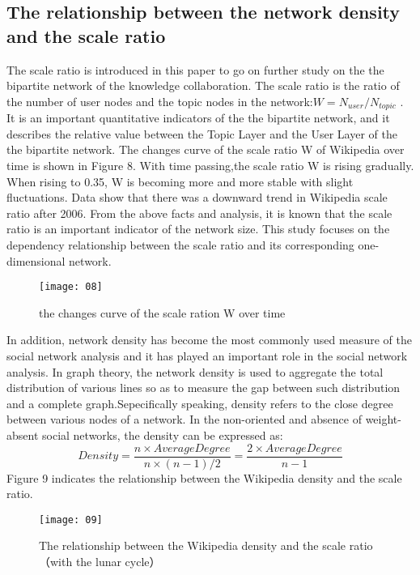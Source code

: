 \documentclass{elsarticle}
\begin{document}
\subsection{The relationship between the network density and the scale ratio}
\label{sec:relat-betw-netw}
The scale ratio is introduced in this paper to go on further study on
the the bipartite network of the knowledge collaboration. The scale
ratio is the ratio of the number of user nodes and the topic nodes in
the network:$W=N_{user}/N_{topic}$ . It is an important quantitative
indicators of the the bipartite network, and it describes the relative
value between the Topic Layer and the User Layer of the the bipartite
network. The changes curve of the scale ratio W of Wikipedia over time
is shown in Figure 8. With time passing,the scale ratio W is rising
gradually. When rising to 0.35, W is becoming more and more stable
with slight fluctuations. Data show that there was a downward trend in
Wikipedia scale ratio after 2006. From the above facts and analysis,
it is known that the scale ratio is an important indicator of the
network size. This study focuses on the dependency relationship
between the scale ratio and its corresponding one-dimensional network.
\begin{figure}[htpb]
  \centering
  \texttt{[image: 08]}
  \caption{the changes curve of the scale ration W over time}
\end{figure}
In addition, network density has become the most commonly used measure of the social network analysis and it has played an important role in the social network analysis. In graph theory, the network density is used to aggregate the total distribution of various lines so as to measure the gap between such distribution and a complete graph.Sepecifically speaking, density refers to the close degree between various nodes of a network. In the non-oriented and absence of weight-absent social networks, the density can be expressed as:
\begin{equation}
  \label{eq:3}
  Density=\frac{n\times AverageDegree}{n\times(n-1)/2}=\frac{2\times AverageDegree}{n-1}
\end{equation}
Figure 9 indicates the relationship between the Wikipedia density and the scale ratio. 
\begin{figure}[htpb]
  \centering
  \texttt{[image: 09]}
  \caption{The relationship between the Wikipedia density and the scale ratio （with the lunar cycle）}
\end{figure}
\end{document}
